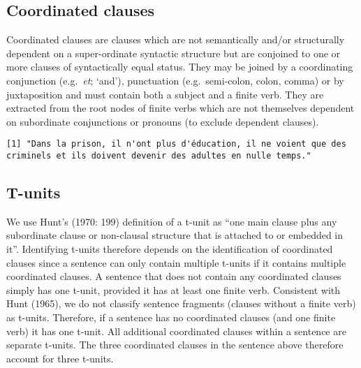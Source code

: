 \documentclass[
]{article}
\newenvironment{Shaded}{\begin{snugshade}}{\end{snugshade}}
\newcommand{\CommentTok}[1]{\textcolor[rgb]{0.56,0.35,0.01}{\textit{#1}}}
\newcommand{\DataTypeTok}[1]{\textcolor[rgb]{0.13,0.29,0.53}{#1}}
\newcommand{\KeywordTok}[1]{\textcolor[rgb]{0.13,0.29,0.53}{\textbf{#1}}}
\newcommand{\NormalTok}[1]{#1}
\newcommand{\OtherTok}[1]{\textcolor[rgb]{0.56,0.35,0.01}{#1}}
\newcommand{\StringTok}[1]{\textcolor[rgb]{0.31,0.60,0.02}{#1}}
\begin{document}
\hypertarget{coordinated-clauses}{%
\subsection{Coordinated clauses}\label{coordinated-clauses}}

Coordinated clauses are clauses which are not semantically and/or
structurally dependent on a super-ordinate syntactic structure but are
conjoined to one or more clauses of syntactically equal status. They may
be joined by a coordinating conjunction (e.g.~\emph{et}; `and'),
punctuation (e.g.~semi-colon, colon, comma) or by juxtaposition and must
contain both a subject and a finite verb. They are extracted from the
root nodes of finite verbs which are not themselves dependent on
subordinate conjunctions or pronouns (to exclude dependent clauses).

\begin{verbatim}
[1] "Dans la prison, il n'ont plus d'éducation, il ne voient que des criminels et ils doivent devenir des adultes en nulle temps."
\end{verbatim}

\begin{Shaded}
\end{Shaded}

\hypertarget{tunits}{%
\subsection{T-units}\label{tunits}}

We use Hunt's (1970: 199) definition of a t-unit as ``one main clause
plus any subordinate clause or non-clausal structure that is attached to
or embedded in it''. Identifying t-units therefore depends on the
identification of coordinated clauses since a sentence can only contain
multiple t-units if it contains multiple coordinated clauses. A sentence
that does not contain any coordinated clauses simply has one t-unit,
provided it has at least one finite verb. Consistent with Hunt (1965),
we do not classify sentence fragments (clauses without a finite verb) as
t-units. Therefore, if a sentence has no coordinated clauses (and one
finite verb) it has one t-unit. All additional coordinated clauses
within a sentence are separate t-units. The three coordinated clauses in
the sentence above therefore account for three t-units.
\end{document}
